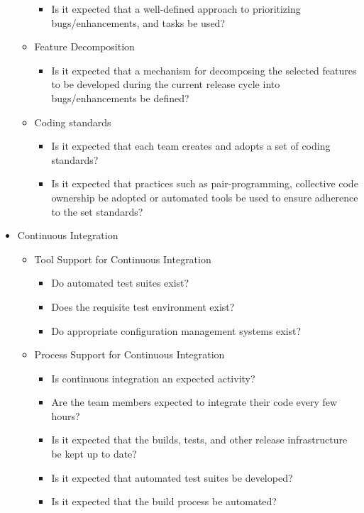 \begin{appendices}
\begin{itemize}
\begin{itemize}
				\begin{itemize}
					\item Is it expected that a well-defined approach to prioritizing bugs/enhancements, and tasks be used?
				\end{itemize}	
			\item Feature Decomposition
				\begin{itemize}
					\item Is it expected that a mechanism for decomposing the selected features to be developed during the current release cycle into bugs/enhancements be defined?
				\end{itemize}
			\item Coding standards
				\begin{itemize}
					\item Is it expected that each team creates and adopts a set of coding standards?
					\item Is it expected that practices such as pair-programming, collective code ownership be adopted or automated tools be used to ensure adherence to the set standards?
				\end{itemize}
		\end{itemize}
	\item Continuous Integration
		\begin{itemize}
			\item Tool Support for Continuous Integration
				\begin{itemize}
					\item Do automated test suites exist?
					\item Does the requisite test environment exist?
					\item Do appropriate configuration management systems exist?
				\end{itemize}
			\item Process Support for Continuous Integration
				\begin{itemize}
					\item Is continuous integration an expected activity?
					\item Are the team members expected to integrate their code every few hours?
					\item Is it expected that the builds, tests, and other release infrastructure be kept up to date?
					\item Is it expected that automated test suites be developed?
					\item Is it expected that the build process be automated?

\end{itemize}
\end{itemize}
\end{itemize}
\end{appendices}
